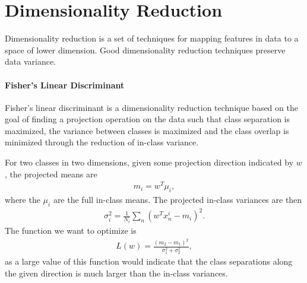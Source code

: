 \section{Dimensionality Reduction}
Dimensionality reduction is a set of techniques for mapping features in data to a space of lower dimension. Good dimensionality reduction techniques preserve data variance.

\paragraph{Fisher's Linear Discriminant}
Fisher's linear discriminant is a dimensionality reduction technique based on the goal of finding a projection operation on the data such that class separation is maximized, the variance between classes is maximized and the class overlap is minimized through the reduction of in-class variance.

For two classes in two dimensions, given some projection direction indicated by $w$, the projected means are
\begin{align*}
	m_{i} = w^{T}\mu_{i},
\end{align*}
where the $\mu_{i}$ are the full in-class means. The projected in-class variances are then
\begin{align*}
	\sigma_{i}^{2} = \frac{1}{N_{i}}\sum\limits_{n}(w^{T}x_{n}^{i} - m_{i})^{2}.
\end{align*}
The function we want to optimize is
\begin{align*}
	L(w) = \frac{(m_{2} - m_{1})^{2}}{\sigma_{1}^{2} + \sigma_{2}^{2}},
\end{align*}
as a large value of this function would indicate that the class separations along the given direction is much larger than the in-class variances.

